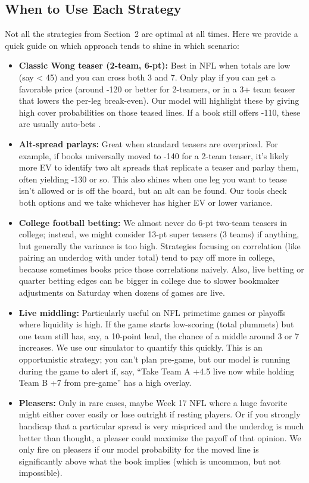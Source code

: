 \documentclass[12pt]{article}
\begin{document}
\subsection{When to Use Each Strategy}
Not all the strategies from Section~2 are optimal at all times. Here we provide a quick guide on which approach tends to shine in which scenario:
\begin{itemize}
    \item \textbf{Classic Wong teaser (2-team, 6-pt):} Best in NFL when totals are low (say < 45) and you can cross both 3 and 7. Only play if you can get a favorable price (around -120 or better for 2-teamers, or in a 3+ team teaser that lowers the per-leg break-even). Our model will highlight these by giving high cover probabilities on those teased lines. If a book still offers -110, these are usually auto-bets \cite{Wong2001}.
    \item \textbf{Alt-spread parlays:} Great when standard teasers are overpriced. For example, if books universally moved to -140 for a 2-team teaser, it’s likely more EV to identify two alt spreads that replicate a teaser and parlay them, often yielding -130 or so. This also shines when one leg you want to tease isn’t allowed or is off the board, but an alt can be found. Our tools check both options and we take whichever has higher EV or lower variance.
    \item \textbf{College football betting:} We almost never do 6-pt two-team teasers in college; instead, we might consider 13-pt super teasers (3 teams) if anything, but generally the variance is too high. Strategies focusing on correlation (like pairing an underdog with under total) tend to pay off more in college, because sometimes books price those correlations naively. Also, live betting or quarter betting edges can be bigger in college due to slower bookmaker adjustments on Saturday when dozens of games are live.
    \item \textbf{Live middling:} Particularly useful on NFL primetime games or playoffs where liquidity is high. If the game starts low-scoring (total plummets) but one team still has, say, a 10-point lead, the chance of a middle around 3 or 7 increases. We use our simulator to quantify this quickly. This is an opportunistic strategy; you can’t plan pre-game, but our model is running during the game to alert if, say, “Take Team A +4.5 live now while holding Team B +7 from pre-game” has a high overlay.
    \item \textbf{Pleasers:} Only in rare cases, maybe Week 17 NFL where a huge favorite might either cover easily or lose outright if resting players. Or if you strongly handicap that a particular spread is very mispriced and the underdog is much better than thought, a pleaser could maximize the payoff of that opinion. We only fire on pleasers if our model probability for the moved line is significantly above what the book implies (which is uncommon, but not impossible).

\end{itemize}
\end{document}

